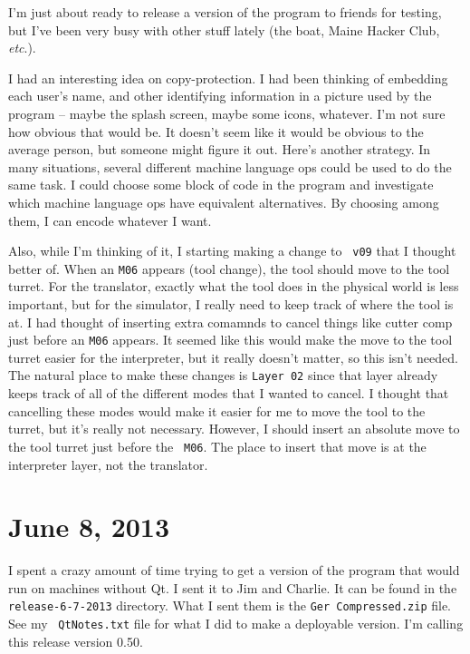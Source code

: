 \documentclass[titlepage,oneside,10pt]{article}
\begin{document}
I'm just about ready to release a version of the program to friends
for testing, but I've been very busy with other stuff lately (the
boat, Maine Hacker Club, \emph{etc}.). 

I had an interesting idea on copy-protection. I had been thinking of
embedding each user's name, and other identifying information in a
picture used by the program -- maybe the splash screen, maybe some
icons, whatever. I'm not sure how obvious that would be. It doesn't
seem like it would be obvious to the average person, but someone might
figure it out. Here's another strategy. In many situations, several
different machine language ops could be used to do the same task. I
could choose some block of code in the program and investigate which
machine language ops have equivalent alternatives. By choosing among
them, I can encode whatever I want.

Also, while I'm thinking of it, I starting making a change to {\tt
  v09} that I thought better of. When an {\tt M06} appears (tool
change), the tool should move to the tool turret. For the translator,
exactly what the tool does in the physical world is less important,
but for the simulator, I really need to keep track of where the tool
is at. I had thought of inserting extra comamnds to cancel things like
cutter comp just before an {\tt M06} appears. It seemed like this
would make the move to the tool turret easier for the interpreter, but
it really doesn't matter, so this isn't needed. The natural place to
make these changes is {\tt Layer 02} since that layer already keeps
track of all of the different modes that I wanted to cancel. I thought
that cancelling these modes would make it easier for me to move the
tool to the turret, but it's really not necessary. However, I should
insert an absolute move to the tool turret just before the {\tt
  M06}. The place to insert that move is at the interpreter layer, not
the translator.

\section {June 8, 2013}

I spent a crazy amount of time trying to get a version of the program
that would run on machines without Qt. I sent it to Jim and
Charlie. It can be found in the {\tt release-6-7-2013} directory. What
I sent them is the {\tt Ger Compressed.zip} file. See my {\tt
  QtNotes.txt} file for what I did to make a deployable version. I'm
calling this release version 0.50.
\end{document}
